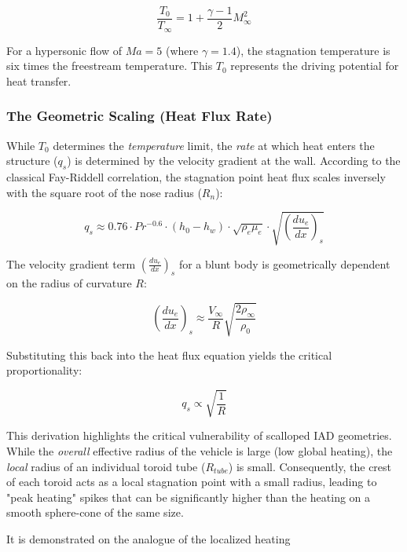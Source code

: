 \begin{equation}
    \frac{T_0}{T_{\infty}} = 1 + \frac{\gamma - 1}{2} M_{\infty}^2
\end{equation}

For a hypersonic flow of $Ma=5$ (where $\gamma=1.4$), the stagnation temperature is six times the freestream temperature. This $T_0$ represents the driving potential for heat transfer.

\subsubsection*{The Geometric Scaling (Heat Flux Rate)}
While $T_0$ determines the \textit{temperature} limit, the \textit{rate} at which heat enters the structure ($q_s$) is determined by the velocity gradient at the wall. According to the classical Fay-Riddell correlation, the stagnation point heat flux scales inversely with the square root of the nose radius ($R_n$):

\begin{equation}
    q_s \approx 0.76 \cdot Pr^{-0.6} \cdot (h_{0} - h_w) \cdot \sqrt{\rho_e \mu_e} \cdot \sqrt{\left( \frac{du_e}{dx} \right)_s}
\end{equation}

The velocity gradient term $\left( \frac{du_e}{dx} \right)_s$ for a blunt body is geometrically dependent on the radius of curvature $R$:

\begin{equation}
    \left( \frac{du_e}{dx} \right)_s \approx \frac{V_{\infty}}{R} \sqrt{\frac{2 \rho_{\infty}}{\rho_{0}}}
\end{equation}

Substituting this back into the heat flux equation yields the critical proportionality:

\begin{equation}
    q_s \propto \sqrt{\frac{1}{R}}
\end{equation}

This derivation highlights the critical vulnerability of scalloped IAD geometries. While the \textit{overall} effective radius of the vehicle is large (low global heating), the \textit{local} radius of an individual toroid tube ($R_{tube}$) is small. Consequently, the crest of each toroid acts as a local stagnation point with a small radius, leading to "peak heating" spikes that can be significantly higher than the heating on a smooth sphere-cone of the same size.

It is demonstrated on the analogue of the localized heating \cite{daub2022experimentsElasticLocalizedHeating}

